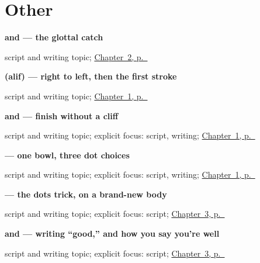 \section*{Other}

\noindent\begin{minipage}[t]{\linewidth}
\raggedright
\textbf{ and  — the glottal catch}\par
\footnotesize script and writing topic; \hyperref[ch:introductions]{Chapter~2, p.~\pageref*{ch:introductions}}
\end{minipage}\par\smallskip

\noindent\begin{minipage}[t]{\linewidth}
\raggedright
\textbf{ (alif) — right to left, then the first stroke}\par
\footnotesize script and writing topic; \hyperref[ch:greetings]{Chapter~1, p.~\pageref*{ch:greetings}}
\end{minipage}\par\smallskip

\noindent\begin{minipage}[t]{\linewidth}
\raggedright
\textbf{ and  — finish \textbf{} without a cliff}\par
\footnotesize script and writing topic; explicit focus: script, writing; \hyperref[ch:greetings]{Chapter~1, p.~\pageref*{ch:greetings}}
\end{minipage}\par\smallskip

\noindent\begin{minipage}[t]{\linewidth}
\raggedright
\textbf{   — one bowl, three dot choices}\par
\footnotesize script and writing topic; explicit focus: script, writing; \hyperref[ch:greetings]{Chapter~1, p.~\pageref*{ch:greetings}}
\end{minipage}\par\smallskip

\noindent\begin{minipage}[t]{\linewidth}
\raggedright
\textbf{   — the dots trick, on a brand-new body}\par
\footnotesize script and writing topic; explicit focus: script; \hyperref[ch:ar-how-are-you]{Chapter~3, p.~\pageref*{ch:ar-how-are-you}}
\end{minipage}\par\smallskip

\noindent\begin{minipage}[t]{\linewidth}
\raggedright
\textbf{ and  — writing \textquotedblleft{}good,\textquotedblright{} and how you say you're well}\par
\footnotesize script and writing topic; explicit focus: script; \hyperref[ch:ar-how-are-you]{Chapter~3, p.~\pageref*{ch:ar-how-are-you}}
\end{minipage}\par\smallskip

